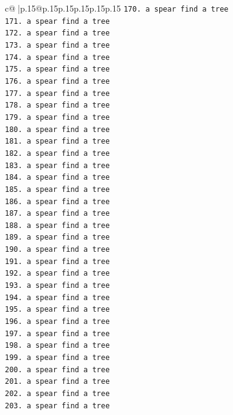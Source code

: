 \documentclass{article}
\begin{document}
{\begin{supertabular}{c@{$\;$}|p{.15\linewidth}@{}p{.15\linewidth}p{.15\linewidth}p{.15\linewidth}p{.15\linewidth}p{.15\linewidth}}
{{{\texttt{170. a spear find a tree} \\
\texttt{171. a spear find a tree} \\
\texttt{172. a spear find a tree} \\
\texttt{173. a spear find a tree} \\
\texttt{174. a spear find a tree} \\
\texttt{175. a spear find a tree} \\
\texttt{176. a spear find a tree} \\
\texttt{177. a spear find a tree} \\
\texttt{178. a spear find a tree} \\
\texttt{179. a spear find a tree} \\
\texttt{180. a spear find a tree} \\
\texttt{181. a spear find a tree} \\
\texttt{182. a spear find a tree} \\
\texttt{183. a spear find a tree} \\
\texttt{184. a spear find a tree} \\
\texttt{185. a spear find a tree} \\
\texttt{186. a spear find a tree} \\
\texttt{187. a spear find a tree} \\
\texttt{188. a spear find a tree} \\
\texttt{189. a spear find a tree} \\
\texttt{190. a spear find a tree} \\
\texttt{191. a spear find a tree} \\
\texttt{192. a spear find a tree} \\
\texttt{193. a spear find a tree} \\
\texttt{194. a spear find a tree} \\
\texttt{195. a spear find a tree} \\
\texttt{196. a spear find a tree} \\
\texttt{197. a spear find a tree} \\
\texttt{198. a spear find a tree} \\
\texttt{199. a spear find a tree} \\
\texttt{200. a spear find a tree} \\
\texttt{201. a spear find a tree} \\
\texttt{202. a spear find a tree} \\
\texttt{203. a spear find a tree} \\
}}}
\end{supertabular}}
\end{document}
